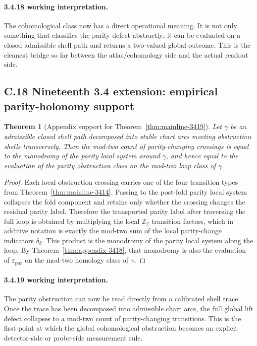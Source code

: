 \documentclass[12pt,a4paper]{article}
\newtheorem{theorem}{Theorem}[section]
\begin{document}
\paragraph{3.4.18 working interpretation.}
The cohomological class now has a direct operational meaning. It is not only something that classifies the parity defect abstractly; it can be evaluated on a closed admissible shell path and returns a two-valued global outcome. This is the cleanest bridge so far between the atlas/cohomology side and the actual readout side.



\subsection*{C.18 Nineteenth 3.4 extension: empirical parity-holonomy support}

\begin{theorem}[Appendix support for Theorem~\ref{thm:mainline-3419}]
\label{thm:appendix-3419}
Let $\gamma$ be an admissible closed shell path decomposed into stable chart arcs meeting obstruction shells transversely. Then the mod-two count of parity-changing crossings is equal to the monodromy of the parity local system around $\gamma$, and hence equal to the evaluation of the parity obstruction class on the mod-two loop class of $\gamma$.
\end{theorem}

\begin{proof}
Each local obstruction crossing carries one of the four transition types from Theorem~\ref{thm:mainline-3414}. Passing to the post-fold parity local system collapses the fold component and retains only whether the crossing changes the residual parity label. Therefore the transported parity label after traversing the full loop is obtained by multiplying the local $\mathbb Z_2$ transition factors, which in additive notation is exactly the mod-two sum of the local parity-change indicators $\delta_k$. This product is the monodromy of the parity local system along the loop. By Theorem~\ref{thm:appendix-3418}, that monodromy is also the evaluation of $\varepsilon_{\mathrm{par}}$ on the mod-two homology class of $\gamma$.
\end{proof}

\paragraph{3.4.19 working interpretation.}
The parity obstruction can now be read directly from a calibrated shell trace. Once the trace has been decomposed into admissible chart arcs, the full global lift defect collapses to a mod-two count of parity-changing transitions. This is the first point at which the global cohomological obstruction becomes an explicit detector-side or probe-side measurement rule.
\end{document}
